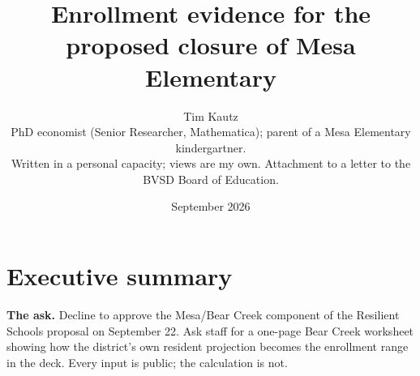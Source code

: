 \documentclass[11pt]{article}
\title{\vspace{-1.8cm}Enrollment evidence for the proposed closure of Mesa Elementary}
\author{Tim Kautz\\ \small PhD economist (Senior Researcher, Mathematica); parent of a Mesa Elementary kindergartner.\\ \small Written in a personal capacity; views are my own. Attachment to a letter to the BVSD Board of Education.}
\date{\small September 2026}
\begin{document}
\maketitle
\vspace{-1.3cm}

\section*{Executive summary}
\begingroup\small\setlength{\parskip}{2pt}
\begin{framed}
\noindent\textbf{The ask.} Decline to approve the Mesa/Bear Creek component of the Resilient Schools proposal on September 22. Ask staff for a one-page Bear Creek worksheet showing how the district's own resident projection becomes the enrollment range in the deck. Every input is public; the calculation is not.
\end{framed}
\end{document}
